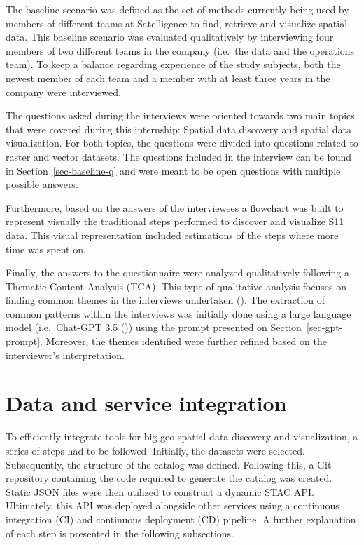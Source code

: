 \documentclass[
  oneside,
  open=any]{scrbook}
\begin{document}
The baseline scenario was defined as the set of methods currently being
used by members of different teams at Satelligence to find, retrieve and
visualize spatial data. This baseline scenario was evaluated
qualitatively by interviewing four members of two different teams in the
company (i.e.~the data and the operations team). To keep a balance
regarding experience of the study subjects, both the newest member of
each team and a member with at least three years in the company were
interviewed.

The questions asked during the interviews were oriented towards two main
topics that were covered during this internship: Spatial data discovery
and spatial data visualization. For both topics, the questions were
divided into questions related to raster and vector datasets. The
questions included in the interview can be found in
Section~\ref{sec-baseline-q} and were meant to be open questions with
multiple possible answers.

Furthermore, based on the answers of the interviewees a flowchart was
built to represent visually the traditional steps performed to discover
and visualize S11 data. This visual representation included estimations
of the steps where more time was spent on.

Finally, the answers to the questionnaire were analyzed qualitatively
following a Thematic Content Analysis (TCA). This type of qualitative
analysis focuses on finding common themes in the interviews undertaken
(). The extraction
of common patterns within the interviews was initially done using a
large language model (i.e.~Chat-GPT 3.5
()) using the prompt
presented on Section~\ref{sec-gpt-prompt}. Moreover, the themes
identified were further refined based on the interviewer's
interpretation.

\section{Data and service
integration}\label{data-and-service-integration}

To efficiently integrate tools for big geo-spatial data discovery and
visualization, a series of steps had to be followed. Initially, the
datasets were selected. Subsequently, the structure of the catalog was
defined. Following this, a Git repository containing the code required
to generate the catalog was created. Static JSON files were then
utilized to construct a dynamic STAC API. Ultimately, this API was
deployed alongside other services using a continuous integration (CI)
and continuous deployment (CD) pipeline. A further explanation of each
step is presented in the following subsections.
\end{document}
